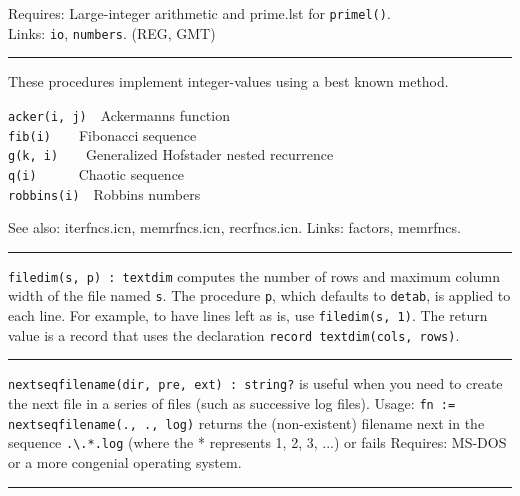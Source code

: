 Requires: Large-integer arithmetic and prime.lst for
\texttt{primel()}.\\
Links: \texttt{io}, \texttt{numbers}. (REG, GMT)

\vspace{0.25cm}\hrule{}

These procedures implement integer-values using a best known method.

\texttt{acker(i, j)}\ \ Ackermann{\textquotesingle}s function\\
\texttt{fib(i)}\ \ \ \ Fibonacci sequence\\
\texttt{g(k, i)}\ \ \ \ Generalized Hofstader nested recurrence\\
\texttt{q(i)}\ \ \ \ \ \ {\textquotedbl}Chaotic{\textquotedbl}
sequence\\
\texttt{robbins(i)}\ \ Robbins numbers

See also: iterfncs.icn, memrfncs.icn, recrfncs.icn. Links: factors,
memrfncs. 

\vspace{0.25cm}\hrule{}

\texttt{filedim(s, p) : textdim} computes the number of rows and maximum
column width of the file named \texttt{s}. The procedure \texttt{p},
which defaults to \texttt{detab}, is applied to each line. For example,
to have lines left as is, use \texttt{filedim(s, 1)}. The return value
is a record that uses the declaration \texttt{record textdim(cols,
rows)}. 

\vspace{0.25cm}\hrule{}

\texttt{nextseqfilename(dir, pre, ext) : string?} is useful when you
need to create the next file in a series of files (such as successive
log files). Usage: \texttt{fn :=
nextseqfilename({\textquotedbl}.{\textquotedbl},
{\textquotedbl}.{\textquotedbl}, {\textquotedbl}log{\textquotedbl})}
returns the (non-existent) filename next in the sequence
\texttt{.{\textbackslash}.*.log} (where the * represents 1, 2, 3, ...)
or fails Requires: MS-DOS or a more congenial operating system.

\vspace{0.25cm}\hrule{}

